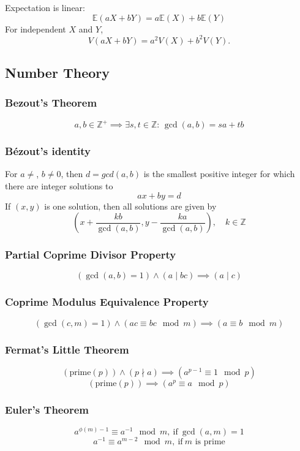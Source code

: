 \documentclass[
	a4paper,
	landscape,
	10pt,
]{article}
\begin{document}
\begin{multicols}{3}
	Expectation is linear:
	\[\mathbb{E}(aX+bY) = a\mathbb{E}(X)+b\mathbb{E}(Y)\]
	For independent $X$ and $Y$, \[V(aX+bY) = a^2V(X)+b^2V(Y).\]

    \subsection{Number Theory}
        \subsubsection*{Bezout's Theorem}
        $$
        a,b \in \mathbb{Z^+} \implies \exists s,t \in \mathbb{Z}: \, \gcd(a,b) = sa + tb
        $$
        \subsubsection*{Bézout's identity}
	For $a \neq $, $b \neq 0$, then $d=gcd(a,b)$ is the smallest positive integer for which there are integer solutions to
	$$ax+by=d$$
	If $(x,y)$ is one solution, then all solutions are given by
	$$\left(x+\frac{kb}{\gcd(a,b)}, y-\frac{ka}{\gcd(a,b)}\right), \quad k\in\mathbb{Z}$$

        \subsubsection*{Partial Coprime Divisor Property}
        $$
        (\gcd(a,b)=1) \land (a \mid bc) \implies (a \mid c)
        $$
        \subsubsection*{Coprime Modulus Equivalence Property}
        $$
        (\gcd(c,m)=1) \land (ac \equiv bc \mod m) \implies (a \equiv b \mod m)
        $$
        \subsubsection*{Fermat's Little Theorem}
        $$
        (\text{prime}(p)) \land (p \nmid a) \implies (a^{p-1} \equiv 1 \mod p)
        $$
        $$
        (\text{prime}(p)) \implies (a^p \equiv a \mod p) 
        $$
		\subsubsection*{Euler's Theorem}
		$$
		a^{\phi(m)-1} \equiv a^{-1} \mod m,~ \text{if}~ \gcd(a,m) = 1
		$$
		$$
		a^{-1} \equiv a^{m-2} \mod m,~ \text{if}~ m \text{ is prime}
		$$



\end{multicols}
\end{document}
